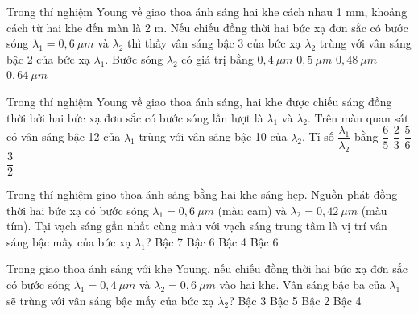 \begin{ex}%
Trong thí nghiệm Young về giao thoa ánh sáng hai khe cách nhau 1 mm, khoảng cách từ hai khe đến màn là 2 m. Nếu chiếu đồng thời hai bức xạ đơn sắc có bước sóng $\lambda_1=0,6\ \mu m $ và $\lambda_2$ thì thấy vân sáng bậc 3 của bức xạ $\lambda_2 $ trùng với vân sáng bậc 2 của bức xạ $\lambda_1 $. Bước sóng $\lambda_2$ có giá trị bằng
\choice
{\True $0,4\ \mu m $}
{ $0,5\ \mu m $}
{ $0,48\ \mu m $}
{ $0,64\ \mu m $}
\end{ex} 
\begin{ex}%
Trong thí nghiệm Young về giao thoa ánh sáng, hai khe được chiếu sáng đồng thời bởi hai bức xạ đơn sắc có bước sóng lần lượt là $\lambda_1 $ và $\lambda_2 $. Trên màn quan sát có vân sáng bậc 12 của $\lambda_1 $ trùng với vân sáng bậc 10 của $\lambda_2 $. Tỉ số $\dfrac{\lambda_1}{\lambda_2} $ bằng
\choice
{$\dfrac{6}{5} $}
{$\dfrac{2}{3} $}
{\True $\dfrac{5}{6} $}
{$\dfrac{3}{2} $}
\end{ex} 
\begin{ex}%
Trong thí nghiệm giao thoa ánh sáng bằng hai khe sáng hẹp. Nguồn phát đồng thời hai bức xạ có bước sóng $\lambda_1=0,6\ \mu m$ (màu cam) và $\lambda_2=0,42\ \mu m$ (màu tím). Tại vạch sáng gần nhất cùng màu với vạch sáng trung tâm là vị trí vân sáng bậc mấy của bức xạ $\lambda_1$?
\choice
{\True Bậc 7}
{Bậc 6}
{Bậc 4}
{Bậc 6}
\end{ex} 
\begin{ex}
Trong giao thoa ánh sáng với khe Young, nếu chiếu đồng thời hai bức xạ đơn sắc có bước sóng $\lambda_{1} = 0,4\ \mu m$ và $\lambda_{2} = 0,6\ \mu m$ vào hai khe. Vân sáng bậc ba của $\lambda_{1}$ sẽ trùng với vân sáng bậc mấy của bức xạ $\lambda_{2}$?
\choice
{Bậc 3}
{Bậc 5}
{\True Bậc 2}
{Bậc 4}
\loigiai{}
\end{ex}


